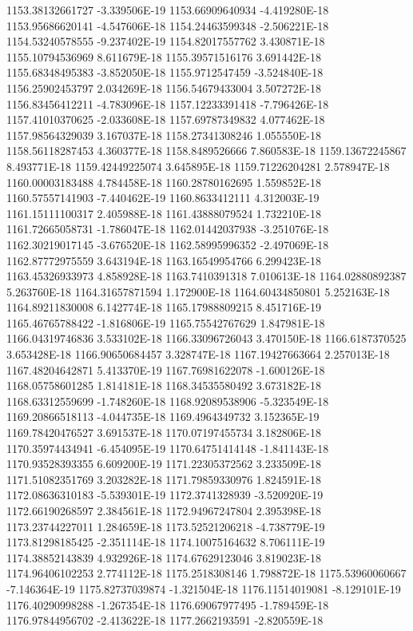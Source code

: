 1153.38132661727  -3.339506E-19
1153.66909640934  -4.419280E-18
1153.95686620141  -4.547606E-18
1154.24463599348  -2.506221E-18
1154.53240578555  -9.237402E-19
1154.82017557762  3.430871E-18
1155.10794536969  8.611679E-18
1155.39571516176  3.691442E-18
1155.68348495383  -3.852050E-18
1155.9712547459  -3.524840E-18
1156.25902453797  2.034269E-18
1156.54679433004  3.507272E-18
1156.83456412211  -4.783096E-18
1157.12233391418  -7.796426E-18
1157.41010370625  -2.033608E-18
1157.69787349832  4.077462E-18
1157.98564329039  3.167037E-18
1158.27341308246  1.055550E-18
1158.56118287453  4.360377E-18
1158.8489526666  7.860583E-18
1159.13672245867  8.493771E-18
1159.42449225074  3.645895E-18
1159.71226204281  2.578947E-18
1160.00003183488  4.784458E-18
1160.28780162695  1.559852E-18
1160.57557141903  -7.440462E-19
1160.8633412111  4.312003E-19
1161.15111100317  2.405988E-18
1161.43888079524  1.732210E-18
1161.72665058731  -1.786047E-18
1162.01442037938  -3.251076E-18
1162.30219017145  -3.676520E-18
1162.58995996352  -2.497069E-18
1162.87772975559  3.643194E-18
1163.16549954766  6.299423E-18
1163.45326933973  4.858928E-18
1163.7410391318  7.010613E-18
1164.02880892387  5.263760E-18
1164.31657871594  1.172900E-18
1164.60434850801  5.252163E-18
1164.89211830008  6.142774E-18
1165.17988809215  8.451716E-19
1165.46765788422  -1.816806E-19
1165.75542767629  1.847981E-18
1166.04319746836  3.533102E-18
1166.33096726043  3.470150E-18
1166.6187370525  3.653428E-18
1166.90650684457  3.328747E-18
1167.19427663664  2.257013E-18
1167.48204642871  5.413370E-19
1167.76981622078  -1.600126E-18
1168.05758601285  1.814181E-18
1168.34535580492  3.673182E-18
1168.63312559699  -1.748260E-18
1168.92089538906  -5.323549E-18
1169.20866518113  -4.044735E-18
1169.4964349732  3.152365E-19
1169.78420476527  3.691537E-18
1170.07197455734  3.182806E-18
1170.35974434941  -6.454095E-19
1170.64751414148  -1.841143E-18
1170.93528393355  6.609200E-19
1171.22305372562  3.233509E-18
1171.51082351769  3.203282E-18
1171.79859330976  1.824591E-18
1172.08636310183  -5.539301E-19
1172.3741328939  -3.520920E-19
1172.66190268597  2.384561E-18
1172.94967247804  2.395398E-18
1173.23744227011  1.284659E-18
1173.52521206218  -4.738779E-19
1173.81298185425  -2.351114E-18
1174.10075164632  8.706111E-19
1174.38852143839  4.932926E-18
1174.67629123046  3.819023E-18
1174.96406102253  2.774112E-18
1175.2518308146  1.798872E-18
1175.53960060667  -7.146364E-19
1175.82737039874  -1.321504E-18
1176.11514019081  -8.129101E-19
1176.40290998288  -1.267354E-18
1176.69067977495  -1.789459E-18
1176.97844956702  -2.413622E-18
1177.2662193591  -2.820559E-18
